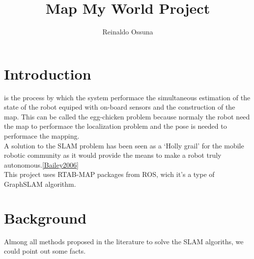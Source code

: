 \documentclass[10pt,journal,compsoc]{IEEEtran}
\begin{document}
\title{Map My World Project}



\author{Reinaldo Ossuna}

%
{}

\maketitle
\IEEEdisplaynontitleabstractindextext
\IEEEpeerreviewmaketitle
\section{Introduction}
\label{sec:introduction}

 is the process by which the system performace the simultaneous estimation of the state of the
robot equiped with on-board sensors and the construction of the map. This can be called the egg-chicken problem because
normaly the robot need the map to performace the localization problem and the pose is needed to performace the
mapping.\\
A solution to the SLAM problem has been seen as a `Holly grail' for the mobile robotic community as it would provide the
means to make a robot truly autonomous.\ref{Bailey2006}\\
This project uses RTAB-MAP packages from ROS, wich it's a type of GraphSLAM algorithm.


\section{Background}

Almong all methods proposed in the literature to solve the SLAM algoriths, we could point out some facts.
\end{document}
